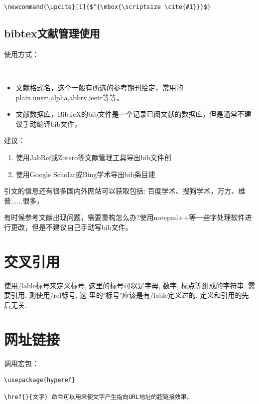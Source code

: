 \documentclass[cn,chinese,color=cyan]{elegantbook}
\begin{document}
\verb|\newcommand{\upcite}[1]{$^{\mbox{\scriptsize \cite{#1}}}$}|

\subsection{bibtex文献管理使用}
使用方式：
\begin{lstlisting}[style=R]


\end{lstlisting}
\begin{itemize}
	\item 文献格式名，这个一般有所选的参考期刊给定，常用的plain,unsrt,alpha,abbrv,ieetr等等。
	\item 文献数据库，BibTeX的bib文件是一个记录已阅文献的数据库，但是通常不建议手动编译bib文件，
\end{itemize}
建议：
\begin{enumerate}
	\item 使用JabRef或Zotero等文献管理工具导出bib文件创
	\item 使用Google Scholar或Bing学术导出bib条目建
\end{enumerate}
引文的信息还有很多国内外网站可以获取包括:
百度学术、搜狗学术，万方、维普......很多，

有时候参考文献出现问题，需要重构怎么办?使用notepad++等一些字处理软件进行更改，但是不建议自己手动写bib文件。
\section{交叉引用}
使用/lable{标号}来定义标号, 这里的标号可以是字母,
数字, 标点等组成的字符串. 需要引用, 则使用/ref{标号}, 这
里的"标号"应该是有/lable定义过的, 定义和引用的先后无关.

\section{网址链接}
调用宏包：
\begin{lstlisting}[style=R]
\usepackage{hyperef}
\end{lstlisting}


\begin{lstlisting}[style=R]
\href{}{文字} 命令可以用来使文字产生指向URL地址的超链接效果。
\end{lstlisting}
\end{document}
